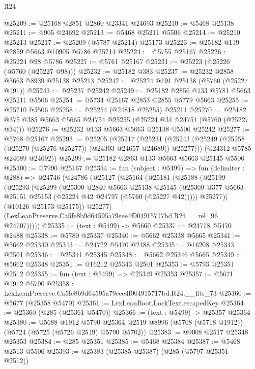 \begin{lexlean}{R24}
\begin{coremodule}
@25209 := @25168 @2851 @2860 @23341 @24693
@25210 := @5468 @25138
@25211 := @905 @24692
@25213 := @5468 @25211 @5506
@25214 := @25210 @25213
@25217 := @25209 (@5787 @25214) @25173
@25223 := @25182 @119 @2859 @5663 @10905 @5786 @25214
@25224 := @5755 @25167
@25226 := @25224 @98 @5786
@25227 := @5761 @25167
@25231 := @25223 (@25226 (@5760 (@25227 @98)))
@25232 := @25182 @383
@25237 := @25232 @2858 @5663 @8939 @25138 @25213
@25242 := @25224 @191 @25138 (@5760 (@25227 @191))
@25243 := @25237 @25242
@25249 := @25182 @2856 @133 @5781 @5663 @25211 @5506
@25254 := @5734 @25167 @2853 @2855 @5779 @5663
@25255 := @25210 @5506
@25258 := @25254 (@24818 @25255) @25211
@25270 := @25182 @375 @385 @5663 @5665 @24754 @25255 (@25224 @34 @24754 (@5760 (@25227 @34)))
@25276 := @25232 @133 @5663 @5663 @25138 @5506 @25242
@25277 := @5768 @25167
@25293 := @25205
    (@25217
      (@25231 (@25243 (@25249 (@25258 (@25270 (@25276 @25277)) (@24303 @24657 @24689)) @25277)))
      (@24312 @5785 @24689 @24692))
@25299 := @25182 @2863 @133 @5663 @5663 @25145 @5506
@25300 := @7990 @25167
@25334 := fun (subject : @5499) =>
  fun (delimiter : @288) =>
  @24746
    (@24786
      (@25127
        (@25164
          (@25181
            (@25188
              (@25199
                (@25293
                  (@25299
                    (@25300
                      @2840
                      @5663
                      @25138
                      @25145
                      (@25300 @377 @5663 @25151 @25153 (@25224 @42 @24797 (@5760 (@25227 @42)))))
                    @25277))
                (@10126 @25173 @25175))
              @25277)
            (LexLeanPreserve.Ca5fe8b9d64595a79eee4f004915717bd.R24.__rel_96 @24707)))))
@25335 := (text : @5499) -> @5660
@25337 := @24718 @5470 @2488
@25338 := @5780 @25337
@25340 := @5662 @25338 @5665
@25341 := @5662 @25340
@25343 := @24722 @5470 @2488
@25345 := @16208 @25343 @2501
@25346 := @25341 @25345
@25348 := @5662 @25346 @5665
@25349 := @5662 @25348
@25351 := @16212 @25343 @2501
@25353 := @5793 @25351 @2512
@25355 := fun (text : @5499) => @25349 @25353
@25357 := @5671 @1912 @5790
@25358 := LexLeanPreserve.Ca5fe8b9d64595a79eee4f004915717bd.R24.__fits_73
@25360 := @5677 (@25358 @5470)
@25361 := LexLeanBoot.LockText.escapedKey
@25364 := @25360 (@285 (@25361 @5470))
@25366 := (text : @5499) -> @25357 @25364
@25380 := @5688
    @1912
    @5790
    @25364
    @2519
    @8996
    (@5708 (@5718 @1912))
    (@5724 (@5725 (@5726 @2519) @5790 @5702))
@25383 := @9008 @2517 @25348 @25353
@25384 := @285 @25351
@25385 := @5468 @25384
@25387 := @5468 @2513 @5506
@25393 := @25383 (@25385 @25387) (@285 (@5797 @25351 @2512))

\end{coremodule}
\end{lexlean}
